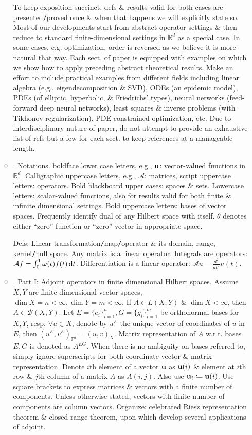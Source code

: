 \documentclass{article}
\begin{document}
\begin{enumerate}
\begin{itemize}
\begin{itemize}
		\end{itemize}
		To keep exposition succinct, defs \& results valid for both cases are presented{\tt/}proved once \& when that happens we will explicitly state so. Most of our developments start from abstract operator settings \& then reduce to standard finite-dimensional settings in $\mathbb{R}^d$ as a special case. In some cases, e.g. optimization, order is reversed as we believe it is more natural that way. Each sect. of paper is equipped with examples on which we show how to apply preceding abstract theoretical results. Make an effort to include practical examples from different fields including linear algebra (e.g., eigendecomposition \& SVD), ODEs (an epidemic model), PDEs (of elliptic, hyperbolic, \& Friedrichs' types), neural networks (feed-forward deep neural networks), least squares \& inverse problems (with Tikhonov regularization), PDE-constrained optimization, etc. Due to interdisciplinary nature of paper, do not attempt to provide an exhaustive list of refs but a few for each sect. to keep references at a manageable length.

		\item {. Notations.} boldface lower case letters, e.g., ${\bf u}$: vector-valued functions in $\mathbb{R}^d$. Calligraphic uppercase letters, e.g., $\mathcal{A}$: matrices, script uppercase letters: operators. Bold blackboard upper cases: spaces \& sets. Lowercase letters: scalar-valued functions, also for results valid for both finite \& infinite dimensional settings. Bold uppercase letters: bases of vector spaces. Frequently identify dual of any Hilbert space with itself. $\theta$ denotes either ``zero'' function or ``zero'' vector in appropriate space.

		Defs: Linear transformation{\tt/}map{\tt/}operator \& its domain, range, kernel{\tt/}null space. Any matrix is a linear operator. Integrals are operators: $\mathcal{A}f = \int_0^1 \omega(t)f(t)\,{\rm d}t$. Differentiation is a linear operator: $\mathcal{A}u = \frac{d^2}{dt^2}u(t)$.

		\item {. Part I: Adjoint operators in finite dimensional Hilbert spaces.} Assume $X,Y$ are finite dimensional vector spaces, $\dim X = n < \infty,\dim Y = m < \infty$. If $A\in L(X,Y)$ \& $\dim X < \infty$, then $A\in\mathcal{B}(X,Y)$. Let $E = \{e_i\}_{i=1}^n,G = \{g_i\}_{i=1}^m$ be orthonormal bases for $X,Y$, resp. $\forall u\in X$, denote by $u^E$ the unique vector of coordinates of $u$ in $E$, then $(u^E,v^E)_{\mathbb{F}^d} = (u,v)_X$. Matrix representation of $A$ w.r.t. bases $E,G$ is denoted as $A^{EG}$. When there is no ambiguity on bases referred to, simply ignore superscripts for both coordinate vector \& matrix representation. Denote $i$th element of a vector ${\bf u}$ as ${\bf u}(i)$ \& element at $i$th row \& $j$th column of a matrix $A$ as $A(i,j)$. Also use ${\bf u}_i\coloneqq{\bf u}(i)$. Use square brackets to express matrices \& vectors with a finite number of components. Unless otherwise stated, vectors with finite number of components are column vectors. Organize: celebrated Riesz representation theorem \& closed range theorem, upon which develop several applications of adjoint.


\end{itemize}
\end{enumerate}
\end{document}
